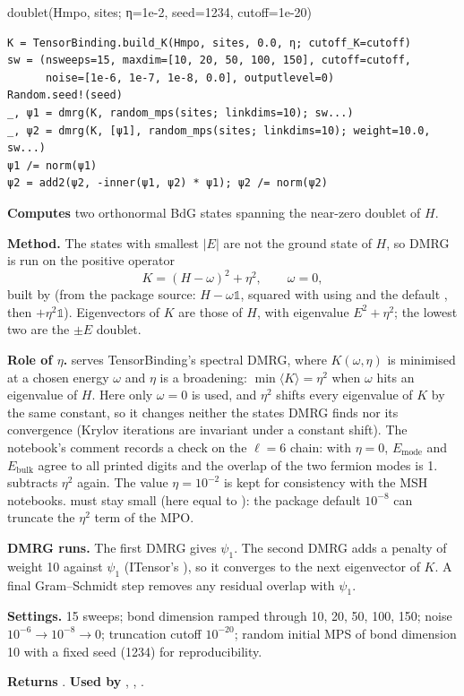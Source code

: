 \documentclass[11pt]{article}
\begin{document}
\begin{function}{doublet(Hmpo, sites; η=1e-2, seed=1234, cutoff=1e-20)}
\begin{Verbatim}
K = TensorBinding.build_K(Hmpo, sites, 0.0, η; cutoff_K=cutoff)
sw = (nsweeps=15, maxdim=[10, 20, 50, 100, 150], cutoff=cutoff,
      noise=[1e-6, 1e-7, 1e-8, 0.0], outputlevel=0)
Random.seed!(seed)
_, ψ1 = dmrg(K, random_mps(sites; linkdims=10); sw...)
_, ψ2 = dmrg(K, [ψ1], random_mps(sites; linkdims=10); weight=10.0, sw...)
ψ1 /= norm(ψ1)
ψ2 = add2(ψ2, -inner(ψ1, ψ2) * ψ1); ψ2 /= norm(ψ2)
\end{Verbatim}
\textbf{Computes} two orthonormal BdG states spanning the near-zero doublet of $H$.

\textbf{Method.} The states with smallest $|E|$ are not the ground state of $H$, so DMRG is run on the positive
operator
\[
  K = (H-\omega)^2 + \eta^2, \qquad \omega=0,
\]
built by  (from the package source: $H-\omega\mathbb 1$, squared with 
using  and the default , then $+\eta^2\mathbb 1$). Eigenvectors of $K$ are
those of $H$, with eigenvalue $E^2+\eta^2$; the lowest two are the $\pm E$ doublet.

\textbf{Role of $\eta$.}  serves TensorBinding's spectral DMRG, where $K(\omega,\eta)$ is minimised at a
chosen energy $\omega$ and $\eta$ is a broadening: $\min\langle K\rangle=\eta^2$ when $\omega$ hits an eigenvalue of $H$.
Here only $\omega=0$ is used, and $\eta^2$ shifts every eigenvalue of $K$ by the same constant, so it changes neither the
states DMRG finds nor its convergence (Krylov iterations are invariant under a constant shift). The notebook's comment
records a check on the $\ell=6$ chain: with $\eta=0$, $E_{\text{mode}}$ and $E_{\text{bulk}}$ agree to all printed digits
and the overlap of the two fermion modes is 1.  subtracts $\eta^2$ again. The value $\eta=10^{-2}$ is
kept for consistency with the MSH notebooks.  must stay small (here equal to ): the package
default $10^{-8}$ can truncate the $\eta^2$ term of the MPO.

\textbf{DMRG runs.} The first DMRG gives $\psi_1$. The second DMRG adds a penalty of
weight 10 against $\psi_1$ (ITensor's ), so it converges to the next eigenvector of
$K$. A final Gram--Schmidt step removes any residual overlap with $\psi_1$.

\textbf{Settings.} 15 sweeps; bond dimension ramped through 10, 20, 50, 100, 150; noise $10^{-6}\to10^{-8}\to0$;
truncation cutoff $10^{-20}$; random initial MPS of bond dimension 10 with a fixed seed (1234) for reproducibility.

\textbf{Returns} . \textbf{Used by} , , .
\end{function}
\end{document}
